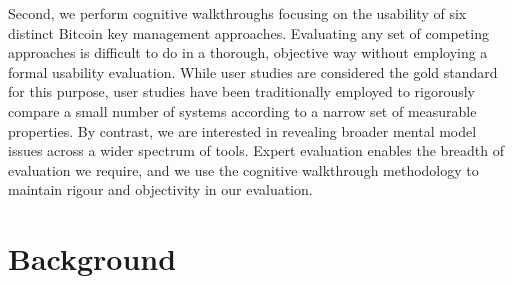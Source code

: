 Second, we perform cognitive walkthroughs focusing on the usability of six distinct Bitcoin key management approaches. Evaluating any set of competing approaches is difficult to do in a thorough, objective way without employing a formal usability evaluation. While user studies are considered the gold standard for this purpose, user studies have been traditionally employed to rigorously compare a small number of systems according to a narrow set of measurable properties. By contrast, we are interested in revealing broader mental model issues across a wider spectrum of tools. Expert evaluation enables the breadth of evaluation we require, and we use the cognitive walkthrough methodology to maintain rigour and objectivity in our evaluation. 




\section{Background}
